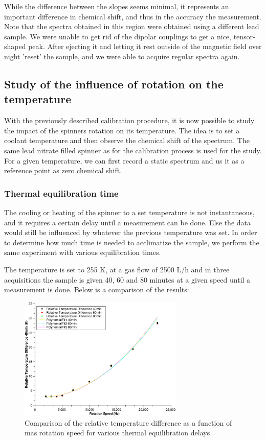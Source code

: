 \documentclass[12pt]{article}
\begin{document}
While the difference between the slopes seems minimal, it represents an important difference in chemical shift, and thus in the accuracy the measurement. Note that the spectra obtained in this region were obtained using a different lead sample. We were unable to get rid of the dipolar couplings to get a nice, tensor-shaped peak. After ejecting it and letting it rest outside of the magnetic field over night 'reset' the sample, and we were able to acquire regular spectra again.

\subsection{Study of the influence of rotation on the temperature}

With the previously described calibration procedure, it is now possible to study the impact of the spinners rotation on its temperature. The idea is to set a coolant temperature and then observe the chemical shift of the spectrum. The same lead nitrate filled spinner as for the calibration process is used for the study. For a given temperature, we can first record a static spectrum and us it as a reference point as zero chemical shift.

\subsubsection{Thermal equilibration time}

The cooling or heating of the spinner to a set temperature is not instantaneous, and it requires a certain delay until a measurement can be done. Else the data would still be influenced by whatever the previous temperature was set. In order to determine how much time is needed to acclimatize the sample, we perform the same experiment with various equilibration times. 

The temperature is set to 255 K, at a gas flow of 2500 L/h and in three acquisitions the sample is given 40, 60 and 80 minutes at a given speed until a measurement is done. Below is a comparison of the results:

\begin{figure}[!ht]
    \centering
    \includegraphics[width=0.7\textwidth]{207Pb/207Pb_255K_Comparison_40_60_80.pdf}
    \caption{Comparison of the relative temperature difference as a function of mas rotation speed for various thermal equilibration delays}
    \label{fig:207Pb_255K_Comparison_40_60_80}
\end{figure}
\FloatBarrier
\end{document}
